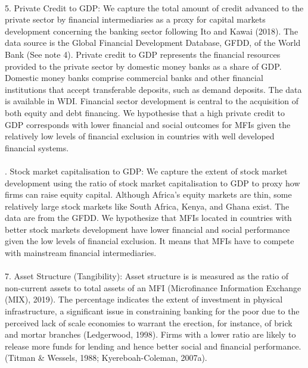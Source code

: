 \documentclass[a4paper, nobind]{templates/ociamthesis}
\begin{document}
\begin{table}
\begin{tabu}
\\
5. Private Credit to GDP: We capture the total amount of credit advanced to the private sector by financial intermediaries as a proxy for capital markets development concerning the banking sector following Ito and Kawai (2018). The data source is the Global Financial Development Database, GFDD, of the World Bank (See note 4). Private credit to GDP represents the financial resources provided to the private sector by domestic money banks as a share of GDP. Domestic money banks comprise commercial banks and other financial institutions that accept transferable deposits, such as demand deposits. The data is available in WDI. Financial sector development is central to the acquisition of both equity and debt financing. We hypothesise that a high private credit to GDP corresponds with lower financial and social outcomes for MFIs given the relatively low levels of financial exclusion in countries with well developed financial systems.\\
\\
. Stock market capitalisation to GDP: We capture the extent of stock market development using the ratio of stock market capitalisation to GDP to proxy how firms can raise equity capital. Although Africa's equity markets are thin, some relatively large stock markets like South Africa, Kenya, and Ghana exist. The data are from the GFDD. We hypothesize that MFIs located in countries with better stock markets development have lower financial and social performance given the low levels of financial exclusion. It means that MFIs have to compete with mainstream financial intermediaries.\\
\\
7. Asset Structure (Tangibility): Asset structure is is measured as the ratio of non-current assets to total assets of an MFI (Microfinance Information Exchange (MIX), 2019). The percentage indicates the extent of investment in physical infrastructure, a significant issue in constraining banking for the poor due to the perceived lack of scale economies to warrant the erection, for instance, of brick and mortar branches (Ledgerwood, 1998). Firms with a lower ratio are likely to release more funds for lending and hence better social and financial performance. (Titman \& Wessels, 1988; Kyereboah-Coleman, 2007a).\\
\\
\bottomrule
{}\\
\\

\end{tabu}
\end{table}
\end{document}
